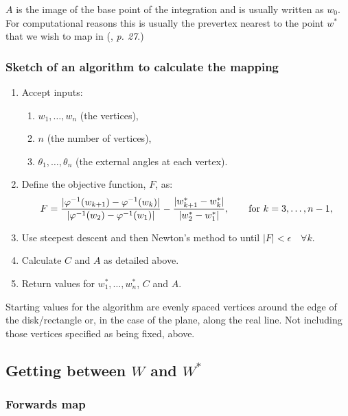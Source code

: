 $A$ is the image of the base point of the integration and is usually written as $w_0$. For computational reasons this is usually the prevertex nearest to the point $w^*$ that we wish to map in   (\cite{driscoll}, \emph{p. 27}.)


\subsubsection{Sketch of an algorithm to calculate the \sch mapping}
\label{algorithmsketch}
\begin{enumerate}
\item Accept inputs:
   \begin{enumerate} 
      \item $w_1,\dots,w_n$ (the vertices),
      \item $n$ (the number of vertices),
      \item $\theta_1,\dots,\theta_n$ (the external angles at each vertex).
   \end{enumerate}
\item Define the objective function, $F$, as:
 \begin{equation*}
F=\frac{\vert \varphi^{-1}(w_{k+1}) -  \varphi^{-1}(w_k) \vert}{\vert \varphi^{-1}(w_2)-\varphi^{-1}(w_1)\vert} - \frac{\vert w^*_{k+1} - w^*_k\vert}{\vert w^*_2 - w^*_1\vert}, \qquad \text{for } k=3,\dots,n-1,
 \end{equation*}
\item Use steepest descent and then Newton's method to until $\vert F\vert < \epsilon \quad \forall k$. \item Calculate $C$ and $A$ as detailed above.
\item Return values for $w^*_1,\dots,w^*_n$, $C$ and $A$.
\end{enumerate}

Starting values for the algorithm are evenly spaced vertices around the edge of the disk/rectangle or, in the case of the plane, along the real line. Not including those vertices specified as being fixed, above.

\subsection{Getting between $W$ and $W^*$}

\subsubsection{Forwards map}

